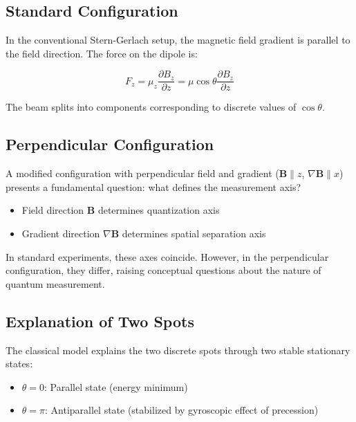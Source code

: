\documentclass[12pt]{article}
\begin{document}
\subsection{Standard Configuration}

In the conventional Stern-Gerlach setup, the magnetic field gradient is parallel to the field direction. The force on the dipole is:

\begin{equation}
F_z = \mu_z \frac{\partial B_z}{\partial z} = \mu \cos\theta \frac{\partial B_z}{\partial z}
\end{equation}

The beam splits into components corresponding to discrete values of $\cos\theta$.

\subsection{Perpendicular Configuration}

A modified configuration with perpendicular field and gradient ($\boldsymbol{B} \parallel z$, $\nabla\boldsymbol{B} \parallel x$) presents a fundamental question: what defines the measurement axis?

\begin{itemize}
\item Field direction $\boldsymbol{B}$ determines quantization axis
\item Gradient direction $\nabla\boldsymbol{B}$ determines spatial separation axis
\end{itemize}

In standard experiments, these axes coincide. However, in the perpendicular configuration, they differ, raising conceptual questions about the nature of quantum measurement.

\subsection{Explanation of Two Spots}

The classical model explains the two discrete spots through two stable stationary states:

\begin{itemize}
\item $\theta = 0$: Parallel state (energy minimum)
\item $\theta = \pi$: Antiparallel state (stabilized by gyroscopic effect of precession)
\end{itemize}
\end{document}
